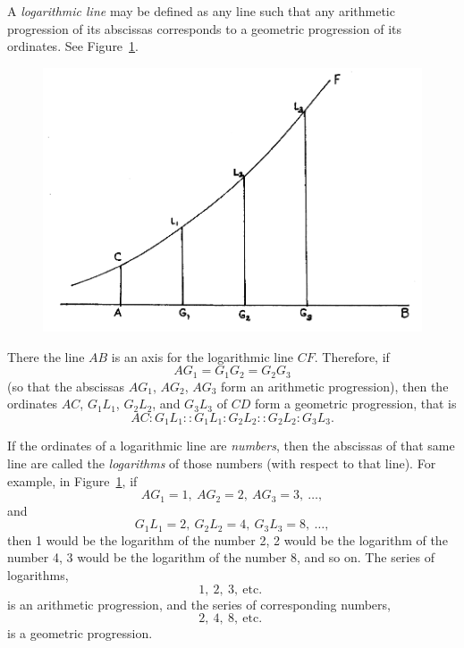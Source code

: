 \documentclass[polutonikogreek,english,twoside,openright]{article}
\begin{document}
A {\em logarithmic line} \label{logdef} may be defined as any line
such that any arithmetic progression of its abscissas corresponds to a
geometric progression of its ordinates.  See Figure~\ref{logs}.
\begin{figure}[htp]
\begin{center}
\includegraphics[width=\textwidth]{fig/Figure27A}
\caption{}
\label{logs}
\vspace{-10pt}
\end{center}
\end{figure}
  There the line $AB$ is an axis for the logarithmic line $CF$.  Therefore, if 
$$AG_1 = G_1G_2 = G_2G_3$$
(so that the abscissas $AG_1$, $AG_2$, $AG_3$ form an arithmetic progression),
 then the ordinates $AC$, $G_1L_1$, $G_2L_2$, and $G_3L_3$ of $CD$ form a geometric progression, that is
$$AC\!:\! G_1L_1 :: G_1L_1 \!:\! G_2L_2 :: G_2L_2 \!:\! G_3L_3.$$

If the ordinates of a logarithmic line are {\em numbers}, then the
abscissas of that same line are called the {\em logarithms} of those
numbers (with respect to that line).  For example, in
Figure~\ref{logs}, if
$$AG_1 = 1,\ AG_2 = 2,\ AG_3 = 3,\ \ldots,$$
and
$$G_1L_1 = 2,\ G_2L_2 = 4,\ G_3L_3 = 8,\ \ldots,$$
then 1 would be the logarithm of the number 2, 2 would be the
logarithm of the number 4, 3 would be the logarithm of the number 8,
and so on.  The series of logarithms,
$$1,\ 2,\ 3,\ \mbox{etc. }$$
is an arithmetic progression, and the series of corresponding numbers,
$$2,\ 4,\ 8,\ \mbox{etc. }$$
is a geometric progression.
\end{document}
